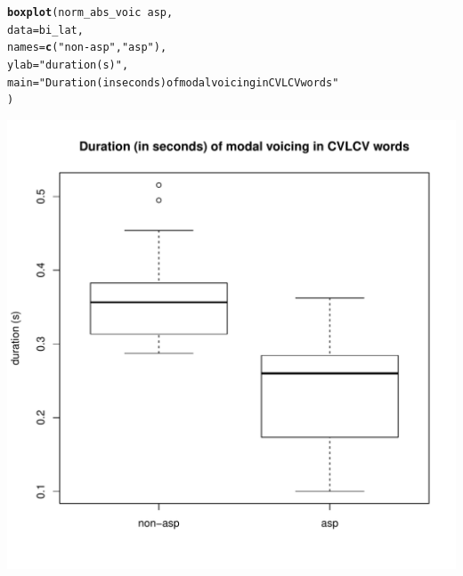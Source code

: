 \documentclass[a4paper,11pt]{article}\usepackage[]{graphicx}\usepackage[]{color}
\makeatletter
\def\maxwidth{ %
  \ifdim\Gin@nat@width>\linewidth
    \linewidth
  \else
    \Gin@nat@width
  \fi
}
\newcommand{\hlstr}[1]{\textcolor[rgb]{0.192,0.494,0.8}{#1}}%
\newcommand{\hlopt}[1]{\textcolor[rgb]{0,0,0}{#1}}%
\newcommand{\hlstd}[1]{\textcolor[rgb]{0.345,0.345,0.345}{#1}}%
\newcommand{\hlkwc}[1]{\textcolor[rgb]{0.333,0.667,0.333}{#1}}%
\newcommand{\hlkwd}[1]{\textcolor[rgb]{0.737,0.353,0.396}{\textbf{#1}}}%
\newenvironment{kframe}{%
 \def\at@end@of@kframe{}%
 \ifinner\ifhmode%
  \def\at@end@of@kframe{\end{minipage}}%
  \begin{minipage}{\columnwidth}%
 \fi\fi%
 \def\FrameCommand##1{\hskip\@totalleftmargin \hskip-\fboxsep
 \colorbox{shadecolor}{##1}\hskip-\fboxsep
     \hskip-\linewidth \hskip-\@totalleftmargin \hskip\columnwidth}%
 \MakeFramed {\advance\hsize-\width
   \@totalleftmargin\z@ \linewidth\hsize
   \@setminipage}}%
 {\par\unskip\endMakeFramed%
 \at@end@of@kframe}
\newenvironment{knitrout}{}{} %
\makeatother
\begin{document}
\begin{knitrout}
\color{fgcolor}\begin{kframe}
\begin{alltt}
\hlkwd{boxplot}\hlstd{(norm_abs_voic} \hlopt{~} \hlstd{asp,}
        \hlkwc{data} \hlstd{= bi_lat,}
        \hlkwc{names} \hlstd{=} \hlkwd{c}\hlstd{(}\hlstr{"non-asp"}\hlstd{,} \hlstr{"asp"}\hlstd{),}
        \hlkwc{ylab} \hlstd{=} \hlstr{"duration (s)"}\hlstd{,}
        \hlkwc{main} \hlstd{=} \hlstr{"Duration (in seconds) of modal voicing in CVLCV words"}
        \hlstd{)}
\end{alltt}
\end{kframe}

{\centering \includegraphics[width=\maxwidth]{img/bi-lat-box-1} 

}



\end{knitrout}
\end{document}
